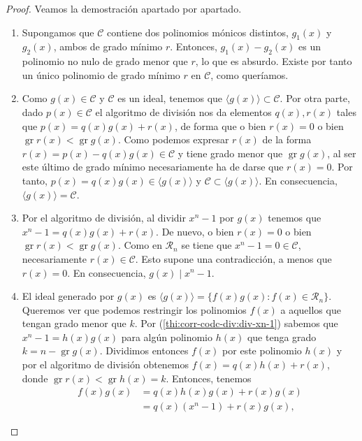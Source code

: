 \begin{proof}
  Veamos la demostración apartado por apartado.
  \begin{enumerate}
    \item Supongamos que \(\mathcal C\) contiene dos polinomios mónicos distintos, \(g_1(x)\) y \(g_2(x)\), ambos de grado mínimo \(r\). 
    Entonces, \(g_1(x) - g_2(x)\) es un polinomio no nulo de grado menor que \(r\), lo que es absurdo. 
    Existe por tanto un único polinomio de grado mínimo \(r\) en \(\mathcal C\), como queríamos.
    \item Como \(g(x) \in \mathcal C\) y \(\mathcal C\) es un ideal, tenemos que \(\langle g(x)\rangle \subset \mathcal C\). 
    Por otra parte, dado \(p(x) \in \mathcal C\) el algoritmo de división nos da elementos \(q(x), r(x)\) tales que \(p(x) = q(x)g(x) + r(x)\), de forma que o bien \(r(x) = 0\) o bien \(\operatorname{gr} r(x) < \operatorname{gr} g(x)\). 
    Como podemos expresar \(r(x)\) de la forma \(r(x) = p(x) - q(x)g(x) \in \mathcal C\) y tiene grado menor que \(\operatorname{gr} g(x)\), al ser este último de grado mínimo necesariamente ha de darse que \(r(x) = 0\).
    Por tanto, \(p(x) = q(x)g(x) \in \langle g(x) \rangle\) y \(\mathcal C \subset \langle g(x) \rangle\).
    En consecuencia, \(\langle g(x) \rangle = \mathcal C\).
    \item Por el algoritmo de división, al dividir \(x^n - 1\) por \(g(x)\) tenemos que \(x^n - 1 = q(x)g(x) + r(x)\). De nuevo, o bien \(r(x) = 0\) o bien \(\operatorname{gr} r(x) < \operatorname{gr} g(x)\).
    Como en \(\mathcal R_n\) se tiene que \(x^n - 1 = 0 \in \mathcal C\), necesariamente \(r(x) \in \mathcal C\).
    Esto supone una contradicción, a menos que \(r(x) = 0\).
    En consecuencia, \(g(x) \mid x^n - 1\).
    \item El ideal generado por \(g(x)\) es \(\langle g(x) \rangle = \{f(x)g(x) : f(x) \in \mathcal R_n\}\).
    Queremos ver que podemos restringir los polinomios \(f(x)\) a aquellos que tengan grado menor que \(k\).
    Por (\ref{thi:corr-codc-div:div-xn-1}) sabemos que \(x^n-1 = h(x)g(x)\) para algún polinomio \(h(x)\) que tenga grado \(k = n - \operatorname{gr} g(x)\).
    Dividimos entonces \(f(x)\) por este polinomio \(h(x)\) y por el algoritmo de división obtenemos \(f(x) = q(x)h(x) + r(x)\), donde \(\operatorname{gr} r(x) < \operatorname{gr} h(x) = k\).
    Entonces, tenemos \begin{align*}
      f(x)g(x) &= q(x)h(x)g(x) + r(x)g(x)\\
               &= q(x)(x^n - 1) + r(x)g(x),

\end{align*}
\end{enumerate}
\end{proof}
